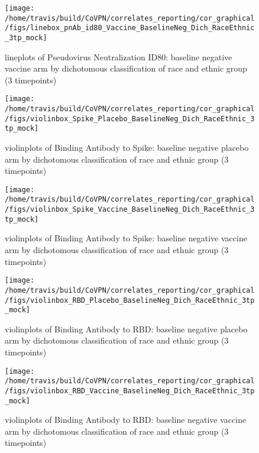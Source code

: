 \documentclass[]{book}
\theoremstyle{definition}
\theoremstyle{definition}
\theoremstyle{definition}
\newcommand{\1}{\mathbbm{1}}
\begin{document}
\clearpage
\begin{figure}[H]

{\centering \texttt{[image: /home/travis/build/CoVPN/correlates\_reporting/cor\_graphical/figs/linebox\_pnAb\_id80\_Vaccine\_BaselineNeg\_Dich\_RaceEthnic\_3tp\_mock]} 

}

\caption{lineplots of Pseudovirus Neutralization ID80: baseline negative vaccine arm by dichotomous classification of race and ethnic group (3 timepoints)}\label{fig:unnamed-chunk-242}
\end{figure}

\clearpage
\begin{figure}[H]

{\centering \texttt{[image: /home/travis/build/CoVPN/correlates\_reporting/cor\_graphical/figs/violinbox\_Spike\_Placebo\_BaselineNeg\_Dich\_RaceEthnic\_3tp\_mock]} 

}

\caption{violinplots of Binding Antibody to Spike: baseline negative placebo arm by dichotomous classification of race and ethnic group (3 timepoints)}\label{fig:unnamed-chunk-243}
\end{figure}

\clearpage
\begin{figure}[H]

{\centering \texttt{[image: /home/travis/build/CoVPN/correlates\_reporting/cor\_graphical/figs/violinbox\_Spike\_Vaccine\_BaselineNeg\_Dich\_RaceEthnic\_3tp\_mock]} 

}

\caption{violinplots of Binding Antibody to Spike: baseline negative vaccine arm by dichotomous classification of race and ethnic group (3 timepoints)}\label{fig:unnamed-chunk-244}
\end{figure}

\clearpage
\begin{figure}[H]

{\centering \texttt{[image: /home/travis/build/CoVPN/correlates\_reporting/cor\_graphical/figs/violinbox\_RBD\_Placebo\_BaselineNeg\_Dich\_RaceEthnic\_3tp\_mock]} 

}

\caption{violinplots of Binding Antibody to RBD: baseline negative placebo arm by dichotomous classification of race and ethnic group (3 timepoints)}\label{fig:unnamed-chunk-245}
\end{figure}

\clearpage
\begin{figure}[H]

{\centering \texttt{[image: /home/travis/build/CoVPN/correlates\_reporting/cor\_graphical/figs/violinbox\_RBD\_Vaccine\_BaselineNeg\_Dich\_RaceEthnic\_3tp\_mock]} 

}

\caption{violinplots of Binding Antibody to RBD: baseline negative vaccine arm by dichotomous classification of race and ethnic group (3 timepoints)}\label{fig:unnamed-chunk-246}
\end{figure}
\end{document}
